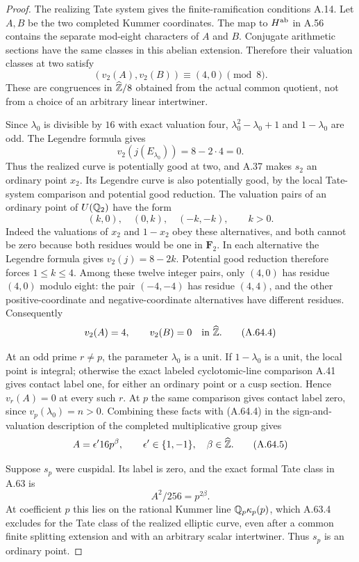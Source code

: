 \begin{proof}
The realizing Tate system gives the finite-ramification
conditions A.14.  Let $A,B$ be the two completed Kummer
coordinates.  The map to $H^{\rm ab}$ in A.56 contains
the separate mod-eight characters of $A$ and $B$.
Conjugate arithmetic sections have the same classes in this
abelian extension.  Therefore their valuation classes at two
satisfy
\[
                (v_2(A),v_2(B))\equiv(4,0)\pmod8.
\tag{A.64.1}
\]
These are congruences in $\widehat{\mathbb Z}/8$ obtained from the
actual common quotient, not from a choice of an arbitrary
linear intertwiner.

Since $\lambda_0$ is divisible by $16$ with exact
valuation four, $\lambda_0^2-\lambda_0+1$ and
$1-\lambda_0$ are odd.  The Legendre formula gives
\[
                         v_2(j(E_{\lambda_0}))=8-2\cdot4=0.
\tag{A.64.2}
\]
Thus the realized curve is potentially good at two, and
A.37 makes $s_2$ an ordinary point $x_2$.
Its Legendre curve is also potentially good, by the local
Tate-system comparison and potential good reduction.
The valuation pairs of an ordinary point of $U(\mathbb Q_2)$
have the form
\[
       (k,0),\quad(0,k),\quad(-k,-k),\qquad k>0.
\tag{A.64.3}
\]
Indeed the valuations of $x_2$ and $1-x_2$ obey these
alternatives, and both cannot be zero because both residues
would be one in $\mathbf F_2$.
In each alternative the Legendre formula gives
$v_2(j)=8-2k$.  Potential good reduction therefore forces
$1\le k\le4$.
Among these twelve integer pairs, only $(4,0)$ has
residue $(4,0)$ modulo eight: the pair $(-4,-4)$ has
residue $(4,4)$, and the other positive-coordinate and
negative-coordinate alternatives have different residues.
Consequently
\[
                          v_2(A)=4,\qquad v_2(B)=0
                              \quad\hbox{in }\widehat{\mathbb Z}.
\tag{A.64.4}
\]

At an odd prime $r\ne p$, the parameter $\lambda_0$ is
a unit.  If $1-\lambda_0$ is a unit, the local point is
integral; otherwise the exact labeled cyclotomic-line
comparison A.41 gives contact label one, for either an
ordinary point or a cusp section.  Hence $v_r(A)=0$
at every such $r$.
At $p$ the same comparison gives contact label zero,
since $v_p(\lambda_0)=n>0$.
Combining these facts with (A.64.4) in the sign-and-valuation
description of the completed multiplicative group gives
\[
                         A=\epsilon'16p^\beta,
            \qquad \epsilon'\in\{1,-1\},\quad
                         \beta\in\widehat{\mathbb Z}.
\tag{A.64.5}
\]

Suppose $s_p$ were cuspidal.  Its label is zero, and the
exact formal Tate class in A.63 is
\[
                         A^2/256=p^{2\beta}.
\tag{A.64.6}
\]
At coefficient $p$ this lies on the rational Kummer line
$\mathbb Q_p\kappa_p(p)$, which A.63.4 excludes for the Tate
class of the realized elliptic curve, even after a common
finite splitting extension and with an arbitrary scalar
intertwiner.  Thus $s_p$ is an ordinary point.


\end{proof}
